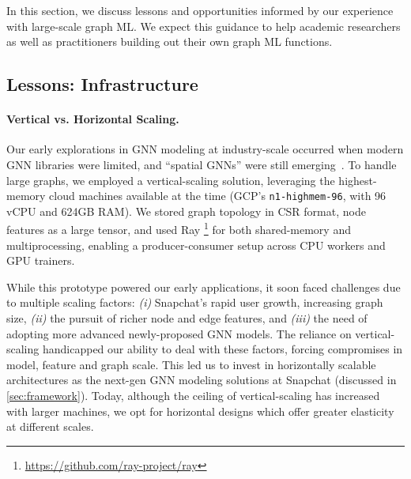 In this section, we discuss lessons and opportunities informed by our experience with large-scale graph ML. We expect this guidance to help academic researchers as well as practitioners building out their own graph ML functions.

\subsection{Lessons: Infrastructure}
\label{sec:lesson-infra}

\paragraph{Vertical vs. Horizontal Scaling.}  Our early explorations in GNN modeling at industry-scale occurred when modern GNN libraries were limited, and ``spatial GNNs'' were still emerging~\citep{hamilton2017inductive, ying2018graph}. To handle large graphs, we employed a vertical-scaling solution, leveraging the highest-memory cloud machines available at the time (GCP's \texttt{n1-highmem-96}, with 96 vCPU and 624GB RAM).  We stored graph topology in CSR format, node features as a large tensor, and used Ray \footnote{\url{https://github.com/ray-project/ray}} for both shared-memory and multiprocessing, enabling a producer-consumer setup across CPU workers and GPU trainers.  


While this prototype powered our early applications, it soon faced challenges due to multiple scaling factors: 
\emph{(i)} Snapchat's rapid user growth, increasing graph size, 
\emph{(ii)} the pursuit of richer node and edge features, and 
\emph{(iii)} the need of adopting more advanced newly-proposed GNN models. 
The reliance on vertical-scaling handicapped our ability to deal with these factors, forcing compromises in model, feature and graph scale. 
This led us to invest in horizontally scalable architectures as the next-gen GNN modeling solutions at Snapchat (discussed in \cref{sec:framework}). Today, although the ceiling of vertical-scaling has increased with larger machines, we opt for horizontal designs which offer greater elasticity at different scales.

